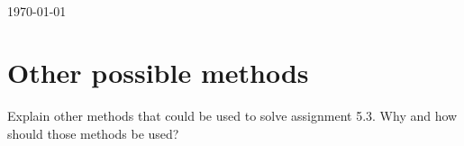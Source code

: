 \documentclass[12pt]{article}
\begin{document}
\begin{titlepage}
\begin{minipage}{0.4\textwidth}
\begin{flushright}
\end{flushright}
\end{minipage}\\[3cm]



{\large \today}\\[3cm] %


 

\vfill %

\end{titlepage}

\section*{Other possible methods}
Explain other methods that could be used to solve assignment 5.3. Why and how should those methods be used?
\end{document}
